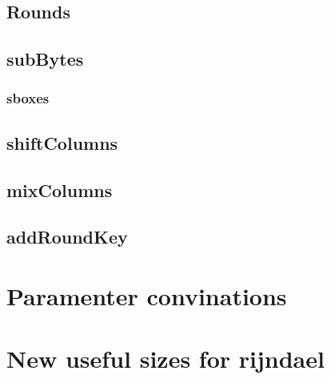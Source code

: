 \documentclass[a4paper,twoside]{llncs}
\begin{document}
 \subsection{Rounds}
 \subsection{subBytes}
 \subsubsection{sboxes}
 \subsection{shiftColumns}
 \subsection{mixColumns}
 \subsection{addRoundKey}
 \section{Paramenter convinations}
 \section{New useful sizes for rijndael}
\cite{Daemen:1999:EBC:1267115.1267119}



\end{document}
